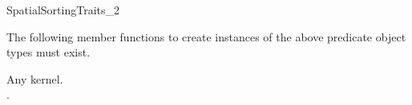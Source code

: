 \begin{ccRefConcept}{SpatialSortingTraits_2}
\ccOperations

The following member functions to create instances of the above predicate
object types must exist. 

\setlength\parskip{0mm}
\ccGlue
{}
\ccGlue
{}
\ccGlue
{}

\ccParDims
\ccHasModels

Any \cgal{} kernel.\\
.


\ccParDims
\end{ccRefConcept}


